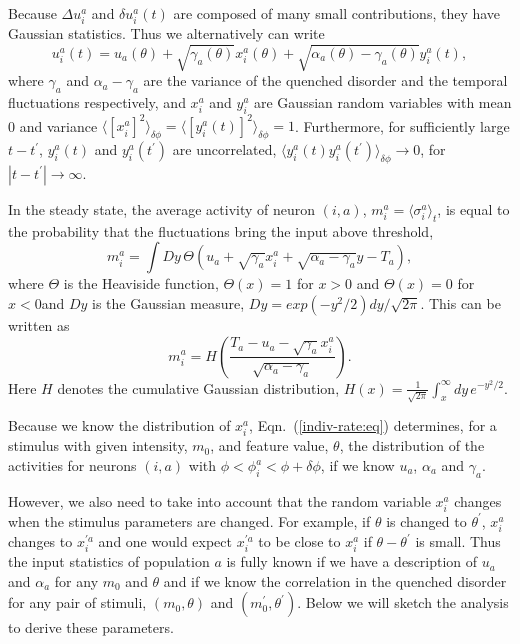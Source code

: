 Because $\Delta u_i^a$ and $\delta u_i^{a}(t)$ are composed of many small
contributions, they have Gaussian statistics.
Thus we alternatively can write
\begin{equation}
u_i^a(t)=u_{a}(\theta)+\sqrt{\gamma_a(\theta)}x_i^a(\theta)+
\sqrt{\alpha_a(\theta)-\gamma_a(\theta)}y_i^a(t),
\label{input_terms1:eq}
\end{equation}
where $\gamma_a$ and $\alpha_a-\gamma_a$ are the variance of the quenched 
disorder and the temporal fluctuations respectively, and $x_i^a$ and $y_i^a$ 
are Gaussian random variables with mean 0 and variance 
$\langle [x_i^a]^2\rangle_{\delta \phi}=
\langle [y_i^a(t)]^2\rangle_{\delta \phi}=1$\@. Furthermore, for sufficiently 
large $t-t^\prime$, $y_i^a(t)$ and $y_i^a(t^\prime)$ are uncorrelated,
$\langle y_i^a(t)y_i^a(t^\prime)\rangle_{\delta \phi}\rightarrow 0$, for
$|t-t^\prime|\rightarrow\infty$\@.

In the steady state, the average activity of neuron $(i,a)$, $m_i^a=
\langle \sigma_i^a\rangle_t$, is equal to the probability that the
fluctuations bring the input above threshold,
\begin{equation}
m_i^a=\int\! Dy
\,\Theta \left(u_a+\sqrt{\gamma_a}x_i^a+\sqrt{\alpha_a-\gamma_a}y-T_a\right),
\end{equation}
where $\Theta$ is the Heaviside function, $\Theta(x)=1$ for $x>0$ and
$\Theta(x)=0$ for $x<0$and $Dy$ is the Gaussian measure, 
$Dy=exp(-y^2/2)dy/\sqrt{2\pi}$\@. This can be written as
\begin{equation}
m_i^a=H\left(\frac{T_a-u_a-\sqrt{\gamma_a}x_i^a}{ \sqrt{\alpha_a-\gamma_a}}
\right).
\label{indiv-rate:eq}
\end{equation}
Here $H$ denotes the cumulative Gaussian distribution,
$H(x)=\frac{1}{\sqrt{2\pi}}\int_x^\infty\!dy\,e^{-y^2/2}$\@.

Because we know the distribution of $x_i^a$, Eqn.~(\ref{indiv-rate:eq}) 
determines, for a stimulus with given intensity, $m_0$, and feature value, 
$\theta$, the distribution 
of the activities for neurons $(i,a)$ with $\phi<\phi_i^a<\phi+\delta\phi$, 
if we know $u_a$, $\alpha_a$ and $\gamma_a$\@. 

However, we also need to take into account that the random variable $x_i^a$
changes when the stimulus parameters are changed. For example, if
$\theta$ is changed to $\theta^\prime$, $x_i^a$ changes to
$x_i^{\prime a}$ and one would expect $x_i^{\prime a}$ to be close to
$x_i^a$ if $\theta-\theta^\prime$ is small. Thus the input statistics of 
population $a$ is fully known if we have a
description of $u_a$ and $\alpha_a$ for any $m_0$ and $\theta$ and if we know 
the correlation in the quenched disorder for any pair of stimuli,
$(m_0,\theta)$ and $(m_0^\prime,\theta^\prime)$.  Below we will sketch
the analysis to derive these parameters.

